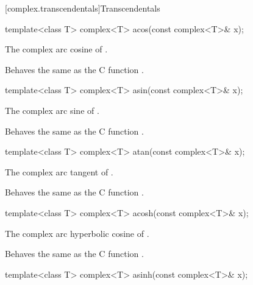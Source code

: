 [complex.transcendentals]{Transcendentals}

%
%
\begin{itemdecl}
template<class T> complex<T> acos(const complex<T>& x);
\end{itemdecl}

\begin{itemdescr}
\pnum
\returns
The complex arc cosine of .

\pnum
\remarks
Behaves the same as the C function .
\end{itemdescr}

%
%
\begin{itemdecl}
template<class T> complex<T> asin(const complex<T>& x);
\end{itemdecl}

\begin{itemdescr}
\pnum
\returns
The complex arc sine of .

\pnum
\remarks
Behaves the same as the C function .
\end{itemdescr}

%
%
\begin{itemdecl}
template<class T> complex<T> atan(const complex<T>& x);
\end{itemdecl}

\begin{itemdescr}
\pnum
\returns
The complex arc tangent of .

\pnum
\remarks
Behaves the same as the C function .
\end{itemdescr}

%
%
\begin{itemdecl}
template<class T> complex<T> acosh(const complex<T>& x);
\end{itemdecl}

\begin{itemdescr}
\pnum
\returns
The complex arc hyperbolic cosine of .

\pnum
\remarks
Behaves the same as the C function .
\end{itemdescr}

%
%
\begin{itemdecl}
template<class T> complex<T> asinh(const complex<T>& x);
\end{itemdecl}


